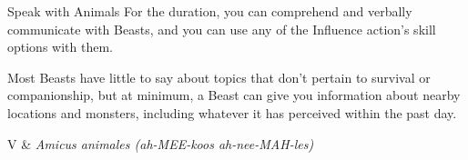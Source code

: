 \begin{Spell}[
    tags=Ritual,
    level=1st,
    time=1 Action,
    range=Self,
    components={V,S},
    duration=10 Minutes,
    school=Divination,
    attack=None,
    effect=Communication
]{Speak with Animals}
For the duration, you can comprehend and verbally communicate with Beasts, and you can use any of the Influence action's skill options with them.

Most Beasts have little to say about topics that don't pertain to survival or companionship, but at minimum, a Beast can give you information about nearby locations and monsters, including whatever it has perceived within the past day.
\begin{components}
V & \textit{Amicus animales (ah-MEE-koos ah-nee-MAH-les)}
\end{components}
\end{Spell}



